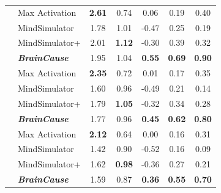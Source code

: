 \begin{table}[h]
\begin{tabular}{@{}clccccc@{}}
\addlinespace[2pt]
\midrule

\multirow{4}{*}{200}
& Max Activation
& \textbf{2.61} & 0.74 & 0.06 & 0.19 & 0.40 \\
& MindSimulator
& 1.78 & 1.01 & -0.47 & 0.25 & 0.19 \\
& MindSimulator+
& 2.01 & \textbf{1.12} & -0.30 & 0.39 & 0.32 \\
& \emph{\textbf{BrainCause}}
& 1.95 & 1.04 & \textbf{0.55} & \textbf{0.69} & \textbf{0.90} \\

\addlinespace[2pt]
\midrule

\multirow{4}{*}{500}
& Max Activation
& \textbf{2.35} & 0.72 & 0.01 & 0.17 & 0.35 \\
& MindSimulator
& 1.60 & 0.96 & -0.49 & 0.21 & 0.14 \\
& MindSimulator+
& 1.79 & \textbf{1.05} & -0.32 & 0.34 & 0.28 \\
& \emph{\textbf{BrainCause}}
& 1.77 & 0.96 & \textbf{0.45} & \textbf{0.62} & \textbf{0.80} \\

\addlinespace[2pt]
\midrule

\multirow{4}{*}{1000}
& Max Activation
& \textbf{2.12} & 0.64 & 0.00 & 0.16 & 0.31 \\
& MindSimulator
& 1.42 & 0.90 & -0.52 & 0.16 & 0.09 \\
& MindSimulator+
& 1.62 & \textbf{0.98} & -0.36 & 0.27 & 0.21 \\
& \emph{\textbf{BrainCause}}
& 1.59 & 0.87 & \textbf{0.36} & \textbf{0.55} & \textbf{0.70} \\

\bottomrule
\end{tabular}
\label{tab:scores_top50_all_roi_sizes}
\vspace{-0.3cm}
\end{table}